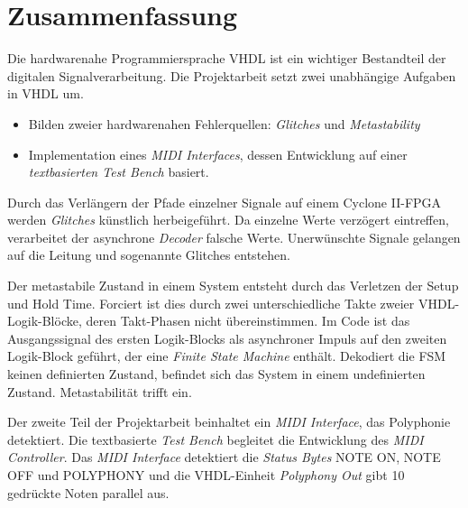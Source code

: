 
\chapter*{Zusammenfassung}

Die hardwarenahe Programmiersprache VHDL ist ein wichtiger Bestandteil der digitalen Signalverarbeitung. Die Projektarbeit setzt zwei unabhängige Aufgaben in VHDL um.

\begin{itemize}
\item Bilden zweier hardwarenahen Fehlerquellen: \textit{Glitches} und \textit{Metastability}
	\item Implementation eines \textit{MIDI Interfaces}, dessen Entwicklung auf einer \textit{textbasierten Test Bench} basiert.
\end{itemize} 

Durch das Verlängern der Pfade einzelner Signale auf einem Cyclone II-FPGA werden \textit{Glitches} künstlich herbeigeführt. Da einzelne Werte verzögert eintreffen, verarbeitet der asynchrone \textit{Decoder} falsche Werte. Unerwünschte Signale gelangen auf die Leitung und sogenannte Glitches entstehen. 

Der metastabile Zustand in einem System entsteht durch das Verletzen der Setup und Hold Time. Forciert ist dies durch zwei unterschiedliche Takte zweier VHDL-Logik-Blöcke, deren Takt-Phasen nicht übereinstimmen. Im Code ist das Ausgangssignal des ersten Logik-Blocks als asynchroner Impuls auf den zweiten Logik-Block geführt, der eine \textit{Finite State Machine} enthält. Dekodiert die FSM keinen definierten Zustand, befindet sich das System in einem undefinierten Zustand. Metastabilität trifft ein.

Der zweite Teil der Projektarbeit beinhaltet ein \textit{MIDI Interface}, das Polyphonie detektiert. Die textbasierte \textit{Test Bench} begleitet die Entwicklung des \textit{MIDI Controller}. Das \textit{MIDI Interface} detektiert die \textit{Status Bytes} NOTE ON, NOTE OFF und POLYPHONY und die VHDL-Einheit \textit{Polyphony Out} gibt 10 gedrückte Noten parallel aus.
